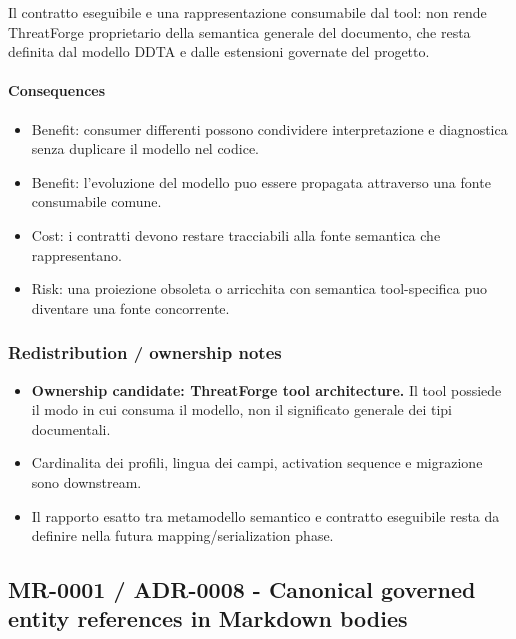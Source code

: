 \documentclass[
  10pt,
]{article}
\providecommand{\tightlist}{%
  \setlength{\itemsep}{0pt}\setlength{\parskip}{0pt}}
\begin{document}
Il contratto eseguibile e una rappresentazione consumabile dal tool: non
rende ThreatForge proprietario della semantica generale del documento,
che resta definita dal modello DDTA e dalle estensioni governate del
progetto.

\paragraph{Consequences}\label{consequences-11}

\begin{itemize}
\tightlist
\item
  Benefit: consumer differenti possono condividere interpretazione e
  diagnostica senza duplicare il modello nel codice.
\item
  Benefit: l'evoluzione del modello puo essere propagata attraverso una
  fonte consumabile comune.
\item
  Cost: i contratti devono restare tracciabili alla fonte semantica che
  rappresentano.
\item
  Risk: una proiezione obsoleta o arricchita con semantica
  tool-specifica puo diventare una fonte concorrente.
\end{itemize}

\subsubsection{Redistribution / ownership
notes}\label{redistribution-ownership-notes-5}

\begin{itemize}
\tightlist
\item
  \textbf{Ownership candidate: ThreatForge tool architecture.} Il tool
  possiede il modo in cui consuma il modello, non il significato
  generale dei tipi documentali.
\item
  Cardinalita dei profili, lingua dei campi, activation sequence e
  migrazione sono downstream.
\item
  Il rapporto esatto tra metamodello semantico e contratto eseguibile
  resta da definire nella futura mapping/serialization phase.
\end{itemize}

\subsection{MR-0001 / ADR-0008 - Canonical governed entity references in
Markdown
bodies}\label{mr-0001-adr-0008---canonical-governed-entity-references-in-markdown-bodies}
\end{document}
